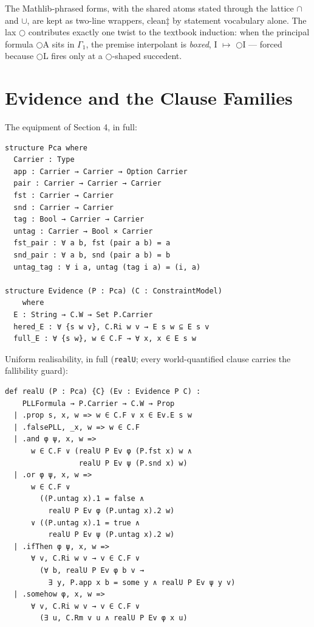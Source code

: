\noindent The Mathlib-phrased forms, with the shared atoms stated
through the lattice \ensuremath{\cap} and \ensuremath{\cup}, are
kept as two-line wrappers, clean‡ by statement vocabulary alone. The
lax \ensuremath{\bigcirc} contributes exactly one twist to the textbook
induction: when the principal formula \ensuremath{\bigcirc}A sits in
\ensuremath{\Gamma{}_{1}}, the premise interpolant is \emph{boxed},
I \ensuremath{\mapsto} \ensuremath{\bigcirc}I --- forced because \ensuremath{\bigcirc}L
fires only at a \ensuremath{\bigcirc}-shaped succedent.

\section{Evidence and the Clause Families}\label{app:evidence}

The equipment of Section 4, in full:

\begin{lstlisting}
structure Pca where
  Carrier : Type
  app : Carrier → Carrier → Option Carrier
  pair : Carrier → Carrier → Carrier
  fst : Carrier → Carrier
  snd : Carrier → Carrier
  tag : Bool → Carrier → Carrier
  untag : Carrier → Bool × Carrier
  fst_pair : ∀ a b, fst (pair a b) = a
  snd_pair : ∀ a b, snd (pair a b) = b
  untag_tag : ∀ i a, untag (tag i a) = (i, a)

structure Evidence (P : Pca) (C : ConstraintModel)
    where
  E : String → C.W → Set P.Carrier
  hered_E : ∀ {s w v}, C.Ri w v → E s w ⊆ E s v
  full_E : ∀ {s w}, w ∈ C.F → ∀ x, x ∈ E s w
\end{lstlisting}

Uniform realisability, in full (\texttt{realU}; every world-quantified
clause carries the fallibility guard):

\begin{lstlisting}
def realU (P : Pca) {C} (Ev : Evidence P C) :
    PLLFormula → P.Carrier → C.W → Prop
  | .prop s, x, w => w ∈ C.F ∨ x ∈ Ev.E s w
  | .falsePLL, _x, w => w ∈ C.F
  | .and φ ψ, x, w =>
      w ∈ C.F ∨ (realU P Ev φ (P.fst x) w ∧
                 realU P Ev ψ (P.snd x) w)
  | .or φ ψ, x, w =>
      w ∈ C.F ∨
        ((P.untag x).1 = false ∧
          realU P Ev φ (P.untag x).2 w)
      ∨ ((P.untag x).1 = true ∧
          realU P Ev ψ (P.untag x).2 w)
  | .ifThen φ ψ, x, w =>
      ∀ v, C.Ri w v → v ∈ C.F ∨
        (∀ b, realU P Ev φ b v →
          ∃ y, P.app x b = some y ∧ realU P Ev ψ y v)
  | .somehow φ, x, w =>
      ∀ v, C.Ri w v → v ∈ C.F ∨
        (∃ u, C.Rm v u ∧ realU P Ev φ x u)
\end{lstlisting}

